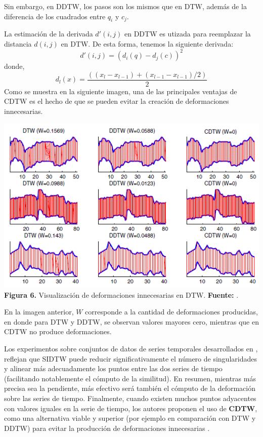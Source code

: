 Sin embargo, en DDTW, los pasos son los mismos que en DTW, adem\'as de la diferencia de los cuadrados entre $q_i$ y $c_j$.\par
La estimaci\'on de la derivada $d'(i,j)$ en DDTW es utizada para reemplazar la distancia $d(i,j)$ en DTW. De esta forma, tenemos la siguiente derivada:
\begin{equation}
d'(i,j) = (d_i(q) - d_j(c))^2
\end{equation}
donde, 
\begin{equation}
d_l(x) = \frac{((x_l - x_{l-1}) + (x_{l-1} - x_{l-1})/2)}{2}
\end{equation}
Como se muestra en la siguiente imagen, una de las principales ventajas de CDTW es el hecho de que se pueden evitar la creaci\'on de deformaciones innecesarias.
\begin{center}
\includegraphics[scale=0.8]{cdtw.png}\\
\vspace*{10pt}
\footnotesize{\textbf{Figura 6.} Visualizaci\'on de deformaciones innecesarias en DTW.} \textbf{Fuente:} \cite{DTWcubicsplineinterpolation}.
\end{center}
En la imagen anterior, $W$ corresponde a la cantidad de deformaciones producidas, en donde para DTW y DDTW, se observan valores mayores cero, mientras que en CDTW no produce deformaciones.\par
Los experimentos sobre conjuntos de datos de series temporales desarrollados en \cite{DTWcubicsplineinterpolation}, reflejan que SIDTW puede reducir significativamente el n\'umero de singularidades y alinear m\'as adecuadamente los puntos entre las dos series de tiempo (facilitando notablemente el c\'omputo de la similitud). En resumen, mientras m\'as precisa sea la pendiente, m\'as efectivo ser\'a tambi\'en el c\'omputo de la deformaci\'on sobre las series de tiempo. Finalmente, cuando existen muchos puntos adyacentes con valores iguales en la serie de tiempo, los autores proponen el uso de \textbf{CDTW}, como una alternativa viable y superior (por ejemplo en comparaci\'on con DTW y DDTW) para evitar la producci\'on de deformaciones innecesarias 	\cite{DTWcubicsplineinterpolation}.

